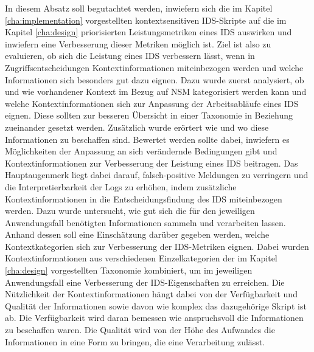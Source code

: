 In diesem Absatz soll begutachtet werden, inwiefern sich die im Kapitel \ref{cha:implementation} vorgestellten kontextsensitiven IDS-Skripte auf die im Kapitel \ref{cha:design} priorisierten Leistungsmetriken eines IDS auswirken und inwiefern eine Verbesserung dieser Metriken möglich ist. Ziel ist also zu evaluieren, ob sich die Leistung eines IDS verbessern lässt, wenn in Zugriffsentscheidungen Kontextinformationen miteinbezogen werden und welche Informationen sich besonders gut dazu eignen.
Dazu wurde zuerst analysiert, ob und wie vorhandener Kontext im Bezug auf NSM kategorisiert werden kann und welche Kontextinformationen sich zur Anpassung der Arbeitsabläufe eines IDS eignen. Diese sollten zur besseren Übersicht in einer Taxonomie in Beziehung zueinander gesetzt werden. Zusätzlich wurde erörtert wie und wo diese Informationen zu beschaffen sind. Bewertet werden sollte dabei, inwiefern es Möglichkeiten der Anpassung an sich verändernde Bedingungen gibt und Kontextinformationen zur Verbesserung der Leistung eines IDS beitragen.
Das Hauptaugenmerk liegt dabei darauf, falsch-positive Meldungen zu verringern und die Interpretierbarkeit der Logs zu erhöhen, indem zusätzliche Kontextinformationen in die Entscheidungsfindung des IDS miteinbezogen werden. Dazu wurde untersucht, wie gut sich die für den jeweiligen Anwendungsfall benötigten Informationen sammeln und verarbeiten lassen. Anhand dessen soll eine Einschätzung darüber gegeben werden, welche Kontextkategorien sich zur Verbesserung der IDS-Metriken eignen.
Dabei wurden Kontextinformationen aus verschiedenen Einzelkategorien der im Kapitel \ref{cha:design} vorgestellten Taxonomie kombiniert, um im jeweiligen Anwendungsfall eine Verbesserung der IDS-Eigenschaften zu erreichen.
Die Nützlichkeit der Kontextinformationen hängt dabei von der Verfügbarkeit und Qualität der Informationen sowie davon wie komplex das dazugehörige Skript ist ab. 
Die Verfügbarkeit wird daran bemessen wie anspruchsvoll die Informationen zu beschaffen waren. Die Qualität wird von der Höhe des Aufwandes die Informationen in eine Form zu bringen, die eine Verarbeitung zulässt.




